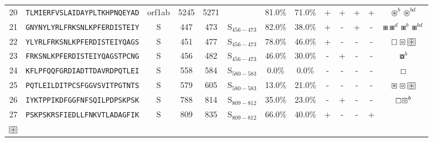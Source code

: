 \begin{tabular}{rcccccccccccc}
20 &  \texttt{TLMIERFVSLAIDAYPLTKHPNQEYAD} &  orf1ab &   5245 &  5271 &                &                          81.0\% &                           71.0\% &          + &           + &          + &           + &                                                                                                       $ \circledast^b \circledast^{bd} $ \\
21 &  \texttt{GNYNYLYRLFRKSNLKPFERDISTEIY} &       S &    447 &   473 &  S$_{456-473}$ &                          82.0\% &                           38.0\% &          + &           - &          + &           - &                                                                                             $ \boxast \boxast^d \boxast^b \boxast^{bd} $ \\
22 &  \texttt{YLYRLFRKSNLKPFERDISTEIYQAGS} &       S &    451 &   477 &  S$_{456-473}$ &                          78.0\% &                           46.0\% &          + &           - &          - &           - &                                                                 $ \boxempty \boxcircle \setlength{\fboxsep}{0.5pt} \boxed{\circledast} $ \\
23 &  \texttt{FRKSNLKPFERDISTEIYQAGSTPCNG} &       S &    456 &   482 &  S$_{456-473}$ &                          46.0\% &                           30.0\% &          - &           + &          - &           - &                                                                                                                         $ \boxcircle^b $ \\
24 &  \texttt{KFLPFQQFGRDIADTTDAVRDPQTLEI} &       S &    558 &   584 &  S$_{580-583}$ &                           0.0\% &                            0.0\% &          - &           - &          - &           - &                                                                                                                            $ \boxempty $ \\
25 &  \texttt{PQTLEILDITPCSFGGVSVITPGTNTS} &       S &    579 &   605 &  S$_{580-583}$ &                          13.0\% &                           21.0\% &          - &           - &          - &           - &                                                                   $ \boxast \boxcircle \setlength{\fboxsep}{0.5pt} \boxed{\circledast} $ \\
26 &  \texttt{IYKTPPIKDFGGFNFSQILPDPSKPSK} &       S &    788 &   814 &  S$_{809-812}$ &                          35.0\% &                           23.0\% &          - &           + &          - &           - &                                                                                                               $ \boxempty \boxcircle^b $ \\
27 &  \texttt{PSKPSKRSFIEDLLFNKVTLADAGFIK} &       S &    809 &   835 &  S$_{809-812}$ &                          66.0\% &                           40.0\% &          + &           - &          - &           + &                       \Centerstack{  $\boxast \boxast^b \boxcircle \boxcircle^d$ \\  $\setlength{\fboxsep}{0.5pt} \boxed{\circledast}$ } \\
\bottomrule
\end{tabular}

